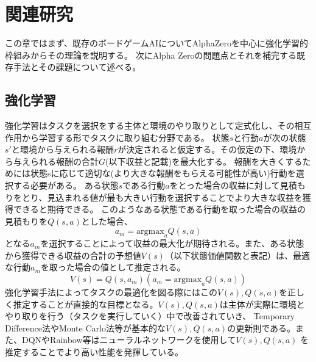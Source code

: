 \chapter{関連研究}
この章ではまず、既存のボードゲームAIについてAlphaZeroを中心に強化学習的枠組みからその理論を説明する。
次にAlpha Zeroの問題点とそれを補完する既存手法とその課題について述べる。



\section{強化学習\cite{RL}}
強化学習はタスクを選択をする主体と環境のやり取りとして定式化し、その相互作用から学習する形でタスクに取り組む分野である。
状態$s$と行動$a$が次の状態$s'$と環境から与えられる報酬$r$が決定されると仮定する。その仮定の下、環境から与えられる報酬の合計$G$(以下収益と記載)を最大化する。
報酬を大きくするためには状態sに応じて適切な(より大きな報酬をもらえる可能性が高い)行動を選択する必要がある。
ある状態$s$である行動$a$をとった場合の収益に対して見積もりをとり、見込まれる値が最も大きい行動を選択することでより大きな収益を獲得できると期待できる。
このようなある状態である行動を取った場合の収益の見積もりを$Q(s, a)$とした場合、
\begin{equation}
	{\displaystyle a_m = {\textrm{argmax}}_{a} Q(s, a)}
\end{equation}
となる$a_m$を選択することによって収益の最大化が期待される。また、ある状態から獲得できる収益の合計の予想値$V(s)$（以下状態価値関数と表記）は、最適な行動$a_m$を取った場合の値として推定される。
\begin{equation}
	{\displaystyle V(s) = Q(s, a_m)(a_m = \textrm{argmax}_{a} Q(s, a))}
\end{equation}
強化学習手法によってタスクの最適化を図る際にはこの$V(s),Q(s, a)$を正しく推定することが直接的な目標となる。$V(s),Q(s, a)$は主体が実際に環境とやり取りを行う（タスクを実行していく）中で改善されていき、
Temporary Difference法やMonte Carlo法等が基本的な$V(s),Q(s, a)$の更新則である。また、DQN\cite{DQN}やRainbow\cite{rainbow}等はニューラルネットワークを使用して$V(s),Q(s, a)$
を推定することでより高い性能を発揮している。



